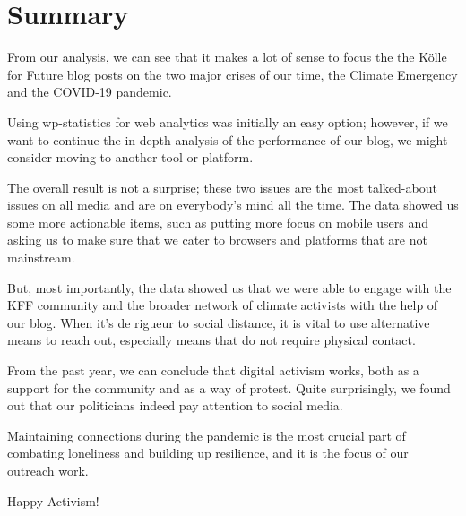 %
%

\pagebreak
\section{Summary}

\onehalfspacing

From our analysis, we can see that it makes a lot of sense to focus the the Kölle for Future blog posts on the two major crises of our time, the Climate Emergency and the COVID-19 pandemic.

Using wp-statistics for web analytics was initially an easy option; however, if we want to continue the in-depth analysis of the performance of our blog, we might consider moving to another tool or platform.

The overall result is not a surprise; these two issues are the most talked-about issues on all media and are on everybody's mind all the time. The data showed us some more actionable items, such as putting more focus on mobile users and asking us to make sure that we cater to browsers and platforms that are not mainstream.

But, most importantly, the data showed us that we were able to engage with the KFF community and the broader network of climate activists with the help of our blog. When it's de rigueur to social distance, it is vital to use alternative means to reach out, especially means that do not require physical contact. 

From the past year, we can conclude that digital activism works, both as a support for the community and as a way of protest. Quite surprisingly, we found out that our politicians indeed pay attention to social media.

Maintaining connections during the pandemic is the most crucial part of combating loneliness and building up resilience, and it is the focus of our outreach work.

Happy Activism!
